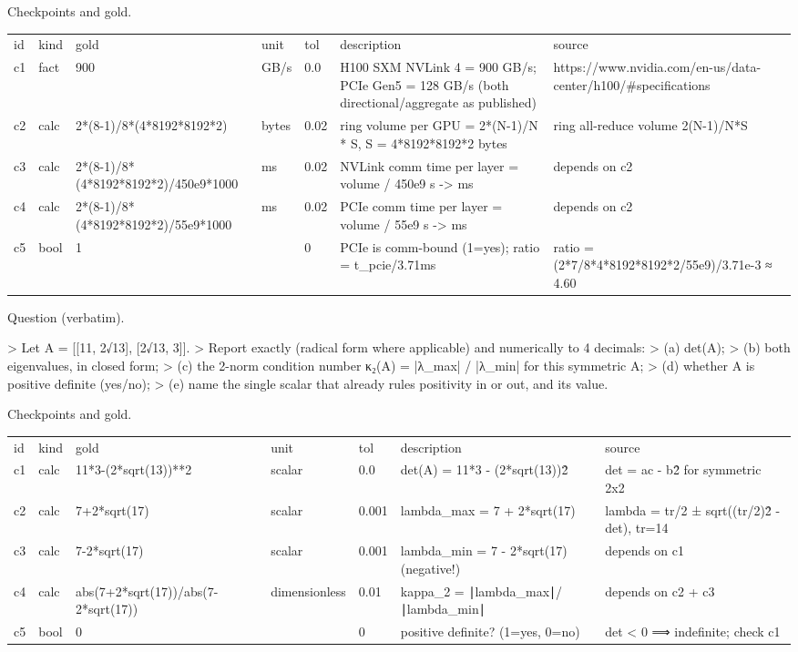 \documentclass[10pt,twocolumn]{article}
\begin{document}
Checkpoints and gold.


\begin{table}[h]
\centering
\begin{tabular}{lllllll}
id & kind & gold & unit & tol & description & source \\
c1 & fact & 900 & GB/s & 0.0 & H100 SXM NVLink 4 = 900 GB/s; PCIe Gen5 = 128 GB/s (both directional/aggregate as published) & https://www.nvidia.com/en-us/data-center/h100/\#specifications \\
c2 & calc & 2*(8-1)/8*(4*8192*8192*2) & bytes & 0.02 & ring volume per GPU = 2*(N-1)/N * S, S = 4*8192*8192*2 bytes & ring all-reduce volume 2(N-1)/N*S \\
c3 & calc & 2*(8-1)/8*(4*8192*8192*2)/450e9*1000 & ms & 0.02 & NVLink comm time per layer = volume / 450e9 s -> ms & depends on c2 \\
c4 & calc & 2*(8-1)/8*(4*8192*8192*2)/55e9*1000 & ms & 0.02 & PCIe comm time per layer = volume / 55e9 s -> ms & depends on c2 \\
c5 & bool & 1 &  & 0 & PCIe is comm-bound (1=yes); ratio = t\_pcie/3.71ms & ratio = (2*7/8*4*8192*8192*2/55e9)/3.71e-3 ≈ 4.60
\end{tabular}
\end{table}


Question (verbatim).


> Let A = [[11, 2√13], [2√13, 3]]. > Report exactly (radical form where applicable) and numerically to 4 decimals: > (a) det(A); > (b) both eigenvalues, in closed form; > (c) the 2-norm condition number κ₂(A) = |λ\_max| / |λ\_min| for this symmetric A; > (d) whether A is positive definite (yes/no); > (e) name the single scalar that already rules positivity in or out, and its value.


Checkpoints and gold.


\begin{table}[h]
\centering
\begin{tabular}{lllllll}
id & kind & gold & unit & tol & description & source \\
c1 & calc & 11*3-(2*sqrt(13))**2 & scalar & 0.0 & det(A) = 11*3 - (2*sqrt(13))\^2 & det = ac - b\^2 for symmetric 2x2 \\
c2 & calc & 7+2*sqrt(17) & scalar & 0.001 & lambda\_max = 7 + 2*sqrt(17) & lambda = tr/2 ± sqrt((tr/2)\^2 - det), tr=14 \\
c3 & calc & 7-2*sqrt(17) & scalar & 0.001 & lambda\_min = 7 - 2*sqrt(17)  (negative!) & depends on c1 \\
c4 & calc & abs(7+2*sqrt(17))/abs(7-2*sqrt(17)) & dimensionless & 0.01 & kappa\_2 = ∣lambda\_max∣/∣lambda\_min∣ & depends on c2 + c3 \\
c5 & bool & 0 &  & 0 & positive definite? (1=yes, 0=no) & det < 0 ⟹ indefinite; check c1
\end{tabular}
\end{table}
\end{document}
